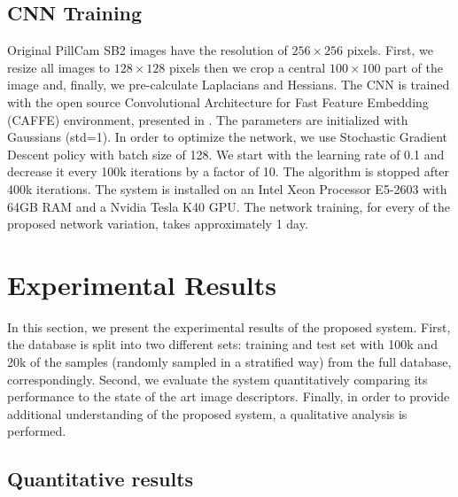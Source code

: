 \documentclass[review,12pt,3p]{elsarticle}
\begin{document}
\subsection{CNN Training}
Original PillCam SB2 images have the resolution of $256 \times 256$ pixels. First, we resize all images to $128 \times 128$ pixels then we crop a central $100 \times 100$ part of the image and, finally, we pre-calculate Laplacians and Hessians. The CNN is trained with the open source Convolutional Architecture for Fast Feature Embedding  (CAFFE) environment, presented in \cite{Jia13caffe}. The parameters are initialized with Gaussians (std=1). In order to optimize the network, we use Stochastic Gradient Descent policy with batch size of 128. We start with the learning rate of 0.1 and decrease it every 100k iterations by a factor of 10. The algorithm is stopped after 400k iterations. The system is installed on an Intel Xeon Processor E5-2603 with 64GB RAM and a Nvidia Tesla K40 GPU. The network training, for every of the proposed network variation, takes approximately 1 day.

\section{Experimental Results}
\label{secResults}

In this section, we present the experimental results of the proposed system. First, the database is split into two different sets: training and test set with 100k and 20k of the samples (randomly sampled in a stratified way) from the full database, correspondingly. Second, we evaluate the system quantitatively comparing its performance to the state of the art image descriptors. Finally, in order to provide additional understanding of the proposed system, a qualitative analysis is performed.

\subsection{Quantitative results}
\end{document}
